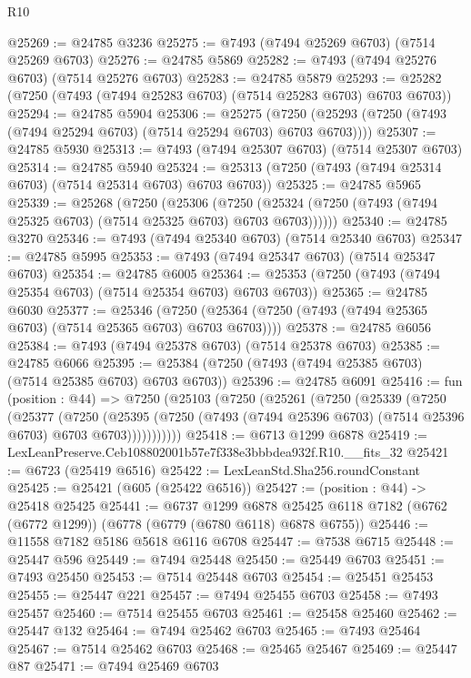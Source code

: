 \begin{lexlean}{R10}
\begin{coremodule}
@25269 := @24785 @3236
@25275 := @7493 (@7494 @25269 @6703) (@7514 @25269 @6703)
@25276 := @24785 @5869
@25282 := @7493 (@7494 @25276 @6703) (@7514 @25276 @6703)
@25283 := @24785 @5879
@25293 := @25282 (@7250 (@7493 (@7494 @25283 @6703) (@7514 @25283 @6703) @6703 @6703))
@25294 := @24785 @5904
@25306 := @25275
    (@7250 (@25293 (@7250 (@7493 (@7494 @25294 @6703) (@7514 @25294 @6703) @6703 @6703))))
@25307 := @24785 @5930
@25313 := @7493 (@7494 @25307 @6703) (@7514 @25307 @6703)
@25314 := @24785 @5940
@25324 := @25313 (@7250 (@7493 (@7494 @25314 @6703) (@7514 @25314 @6703) @6703 @6703))
@25325 := @24785 @5965
@25339 := @25268
    (@7250
      (@25306
        (@7250 (@25324 (@7250 (@7493 (@7494 @25325 @6703) (@7514 @25325 @6703) @6703 @6703))))))
@25340 := @24785 @3270
@25346 := @7493 (@7494 @25340 @6703) (@7514 @25340 @6703)
@25347 := @24785 @5995
@25353 := @7493 (@7494 @25347 @6703) (@7514 @25347 @6703)
@25354 := @24785 @6005
@25364 := @25353 (@7250 (@7493 (@7494 @25354 @6703) (@7514 @25354 @6703) @6703 @6703))
@25365 := @24785 @6030
@25377 := @25346
    (@7250 (@25364 (@7250 (@7493 (@7494 @25365 @6703) (@7514 @25365 @6703) @6703 @6703))))
@25378 := @24785 @6056
@25384 := @7493 (@7494 @25378 @6703) (@7514 @25378 @6703)
@25385 := @24785 @6066
@25395 := @25384 (@7250 (@7493 (@7494 @25385 @6703) (@7514 @25385 @6703) @6703 @6703))
@25396 := @24785 @6091
@25416 := fun (position : @44) =>
  @7250
    (@25103
      (@7250
        (@25261
          (@7250
            (@25339
              (@7250
                (@25377
                  (@7250
                    (@25395
                      (@7250 (@7493 (@7494 @25396 @6703) (@7514 @25396 @6703) @6703 @6703)))))))))))
@25418 := @6713 @1299 @6878
@25419 := LexLeanPreserve.Ceb108802001b57e7f338e3bbbdea932f.R10.__fits_32
@25421 := @6723 (@25419 @6516)
@25422 := LexLeanStd.Sha256.roundConstant
@25425 := @25421 (@605 (@25422 @6516))
@25427 := (position : @44) -> @25418 @25425
@25441 := @6737
    @1299
    @6878
    @25425
    @6118
    @7182
    (@6762 (@6772 @1299))
    (@6778 (@6779 (@6780 @6118) @6878 @6755))
@25446 := @11558 @7182 @5186 @5618 @6116 @6708
@25447 := @7538 @6715
@25448 := @25447 @596
@25449 := @7494 @25448
@25450 := @25449 @6703
@25451 := @7493 @25450
@25453 := @7514 @25448 @6703
@25454 := @25451 @25453
@25455 := @25447 @221
@25457 := @7494 @25455 @6703
@25458 := @7493 @25457
@25460 := @7514 @25455 @6703
@25461 := @25458 @25460
@25462 := @25447 @132
@25464 := @7494 @25462 @6703
@25465 := @7493 @25464
@25467 := @7514 @25462 @6703
@25468 := @25465 @25467
@25469 := @25447 @87
@25471 := @7494 @25469 @6703

\end{coremodule}
\end{lexlean}
